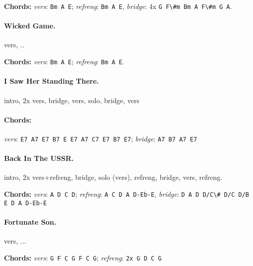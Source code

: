 \documentclass[%
twoside,                 %
final,                   %
10pt]{article}
\begin{document}
\textbf{Chords:} \emph{vers}: \Verb!Bm A E!; \emph{refreng}: \Verb!Bm A E!, \emph{bridge}: 4x
\Verb!G F\#m Bm A F\#m G A!.




\paragraph{Wicked Game.}
vers, ..

\textbf{Chords:} \emph{vers}: \Verb!Bm A E!; \emph{refreng}: \Verb!Bm A E!.





\paragraph{I Saw Her Standing There.}
intro, 2x vers, bridge, vers, solo, bridge, vers

\paragraph{Chords:}
\emph{vers}: \Verb!E7 A7 E7 B7 E E7 A7 C7 E7 B7 E7!; \emph{bridge}: \Verb!A7 B7 A7 E7!










\paragraph{Back In The USSR.}
intro, 2x vers+refreng, bridge, solo (vers), refreng, bridge, vers, refreng.

\textbf{Chords:} \emph{vers}: \Verb!A D C D!; \emph{refreng}: \Verb!A C D A D-Eb-E!,
\emph{bridge}: \Verb!D A D D/C\# D/C D/B E D A D-Eb-E!





\paragraph{Fortunate Son.}
vers, ...

\textbf{Chords:} \emph{vers}: \Verb!G F C G F C G!; \emph{refreng}: \Verb!2x G D C G!





\end{document}
